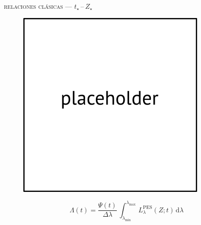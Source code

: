 \documentclass[xcolor=dvipsnames,4pt,hyperref={colorlinks,citecolor=black,linkcolor=black,urlcolor=black}]{beamer}
\begin{document}
\begin{frame}{\textsc{relaciones clásicas --- $t_\star\,$--$\,Z_\star$}}

\begin{figure}
\includegraphics[scale=1]{img/placeholder}
\end{figure}
%
$$\Lambda(t) = \frac{\Psi(t)}{\Delta\lambda}\,\int_{\lambda_\text{min}}^{\lambda_\text{max}}\,L_\lambda^\text{PES}(Z;t)\,\text{d}\lambda$$
%
\end{frame}
\end{document}
